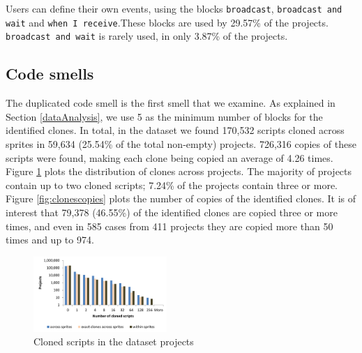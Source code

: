 \documentclass{sig-alternate}
\begin{document}
Users can define their own events, using the blocks \texttt{broadcast}, \texttt{broadcast and wait} and \texttt{when I receive}.These blocks are used by 29.57\% of the projects. \texttt{broadcast and wait} is rarely used, in only 3.87\% of the projects.

\noindent
{}


\subsection{Code smells}
\label{RQ3}
The duplicated code smell is the first smell that we examine. As explained in Section \ref{dataAnalysis}, we use 5 as the minimum number of blocks for the identified clones. In total, in the dataset we found 170,532 scripts cloned across sprites in 59,634 (25.54\% of the total non-empty) projects. 726,316 copies of these scripts were found, making each clone being copied an average of 4.26 times. Figure \ref{fig:clonesprojects} plots the distribution of clones across projects. The majority of projects contain up to two cloned scripts; 7.24\% of the projects contain three or more. Figure \ref{fig:clonescopies} plots the number of copies of the identified clones. It is of interest that 79,378 (46.55\%) of the identified clones are copied three or more times, and even in 585 cases from 411 projects they are copied more than 50 times and up to 974.\footnotemark[\ref{repo}]

\begin{figure}
	\centering
	\includegraphics[width=0.45\textwidth]{fig/charts/11clonesprojects}
	\vspace{-1em}
	\caption{Cloned scripts in the dataset projects}
	\label{fig:clonesprojects}
\end{figure}
\end{document}
